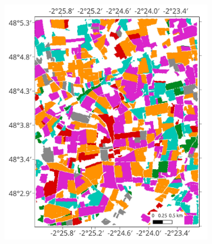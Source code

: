 \documentclass[journal,article,submit,pdftex,moreauthors]{Definitions/mdpi}
\providecommand{\DIFaddbeginFL}{} %
\providecommand{\DIFaddendFL}{} %
\providecommand{\DIFdelbeginFL}{} %
\providecommand{\DIFdelendFL}{} %
\begin{document}
\begin{figure}[H]
	\DIFdelbeginFL %
\DIFdelendFL \DIFaddbeginFL \begin{subfigure}[t]{0.35\linewidth}
	\includegraphics[height=\linewidth,width=\textwidth]{round2_remote_sensing_Andrea_Gonzalez/figures/classification_maps/test_aoi_gt.pdf}
	\DIFaddendFL \caption{}
	\DIFdelbeginFL %
\DIFdelendFL \DIFaddbeginFL \label{fig:test_aoi_gt}
	\DIFaddendFL \end{subfigure}%
	\DIFdelbeginFL %
{%
}

\end{figure}
\end{document}
